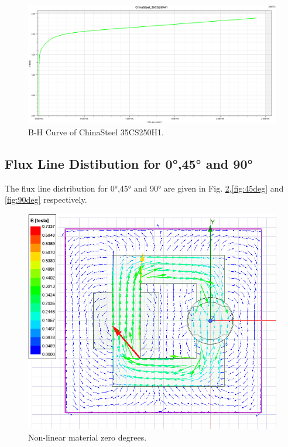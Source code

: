 \documentclass{article}
\begin{document}
\begin{figure}[H]
	\centering
	\includegraphics[width=1\linewidth]{Figurler/Q3/B_H}
	\caption{B-H Curve of ChinaSteel 35CS250H1. }
	\label{fig:bh}
\end{figure}

\subsection{Flux Line Distibution for \ang{0},\ang{45} and \ang{90}}
The flux line distribution for \ang{0},\ang{45} and \ang{90} are given in Fig. \ref{fig:zerodeg},\ref{fig:45deg} and \ref{fig:90deg} respectively.

\begin{figure}[H]
	\centering
	\includegraphics[width=1\linewidth]{Figurler/Q3/zerodeg}
	\caption{Non-linear material zero degrees.}
	\label{fig:zerodeg}
\end{figure}
\end{document}
